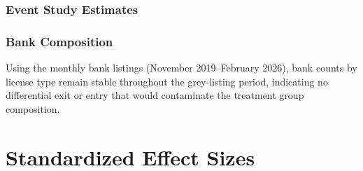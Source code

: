 \documentclass[12pt]{article}
\begin{document}
\subsubsection*{Event Study Estimates}



\subsubsection*{Bank Composition}
Using the monthly bank listings (November 2019--February 2026), bank counts by license type remain stable throughout the grey-listing period, indicating no differential exit or entry that would contaminate the treatment group composition.


\section{Standardized Effect Sizes}
\label{sec:sde}


\end{document}
